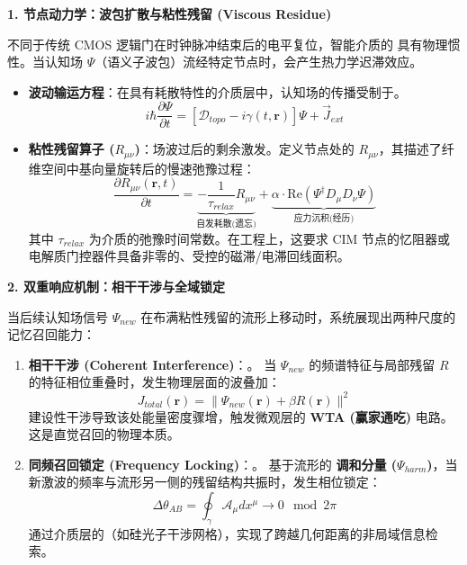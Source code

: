 \textbf{1. 节点动力学：波包扩散与粘性残留 (Viscous Residue)}

不同于传统 CMOS 逻辑门在时钟脉冲结束后的电平复位，智能介质的 具有物理惯性。当认知场 $\Psi$（语义子波包）流经特定节点时，会产生热力学迟滞效应。

\begin{itemize}
    \item \textbf{波动输运方程}：在具有耗散特性的介质层中，认知场的传播受制于。
    \begin{equation}
        i \hbar \frac{\partial \Psi}{\partial t} = \left[ \mathcal{D}_{topo} - i\gamma(t, \mathbf{r}) \right] \Psi + \vec{J}_{ext}
    \end{equation}

    \item \textbf{粘性残留算子 ($R_{\mu\nu}$)}：场波过后的剩余激发。定义节点处的 $R_{\mu\nu}$，其描述了纤维空间中基向量旋转后的慢速弛豫过程：
    \begin{equation}
        \frac{\partial R_{\mu\nu}(\mathbf{r}, t)}{\partial t} = \underbrace{-\frac{1}{\tau_{relax}} R_{\mu\nu}}_{\text{自发耗散(遗忘)}} + \underbrace{\alpha \cdot \text{Re}(\Psi^\dagger D_\mu D_\nu \Psi)}_{\text{应力沉积(经历)}}
    \end{equation}
    其中 $\tau_{relax}$ 为介质的弛豫时间常数。在工程上，这要求 CIM 节点的忆阻器或电解质门控器件具备非零的、受控的磁滞/电滞回线面积。
\end{itemize}

\textbf{2. 双重响应机制：相干干涉与全域锁定}

当后续认知场信号 $\Psi_{new}$ 在布满粘性残留的流形上移动时，系统展现出两种尺度的记忆召回能力：

\begin{enumerate}
    \item \textbf{相干干涉 (Coherent Interference)}：。
    当 $\Psi_{new}$ 的频谱特征与局部残留 $R$ 的特征相位重叠时，发生物理层面的波叠加：
    \begin{equation}
        J_{total}(\mathbf{r}) = \| \Psi_{new}(\mathbf{r}) + \beta R(\mathbf{r}) \|^2
    \end{equation}
    建设性干涉导致该处能量密度骤增，触发微观层的 \textbf{WTA (赢家通吃)} 电路。这是直觉召回的物理本质。

    \item \textbf{同频召回锁定 (Frequency Locking)}：。
    基于流形的 \textbf{调和分量 ($\Psi_{harm}$)}，当新激波的频率与流形另一侧的残留结构共振时，发生相位锁定：
    \begin{equation}
        \Delta \theta_{AB} = \oint_{\gamma} \mathcal{A}_\mu dx^\mu \to 0 \mod 2\pi
    \end{equation}
    通过介质层的（如硅光子干涉网格），实现了跨越几何距离的非局域信息检索。
\end{enumerate}

